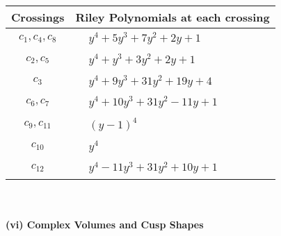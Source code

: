 \documentclass[1p]{elsarticle_modified}
\theoremstyle{definition}
\begin{document}
\begin{tabular}{m{50pt}|m{274pt}}
Crossings & \hspace{64pt}Riley Polynomials at each crossing \\
\hline $$\begin{aligned}c_{1},c_{4},c_{8}\end{aligned}$$&$\begin{aligned}
&y^4+5 y^3+7 y^2+2 y+1
\end{aligned}$\\
\hline $$\begin{aligned}c_{2},c_{5}\end{aligned}$$&$\begin{aligned}
&y^4+y^3+3 y^2+2 y+1
\end{aligned}$\\
\hline $$\begin{aligned}c_{3}\end{aligned}$$&$\begin{aligned}
&y^4+9 y^3+31 y^2+19 y+4
\end{aligned}$\\
\hline $$\begin{aligned}c_{6},c_{7}\end{aligned}$$&$\begin{aligned}
&y^4+10 y^3+31 y^2-11 y+1
\end{aligned}$\\
\hline $$\begin{aligned}c_{9},c_{11}\end{aligned}$$&$\begin{aligned}
&(y-1)^4
\end{aligned}$\\
\hline $$\begin{aligned}c_{10}\end{aligned}$$&$\begin{aligned}
&y^4
\end{aligned}$\\
\hline $$\begin{aligned}c_{12}\end{aligned}$$&$\begin{aligned}
&y^4-11 y^3+31 y^2+10 y+1
\end{aligned}$\\
\hline
\end{tabular}\\~\\
\newpage\flushleft \textbf{(vi) Complex Volumes and Cusp Shapes}
\end{document}
